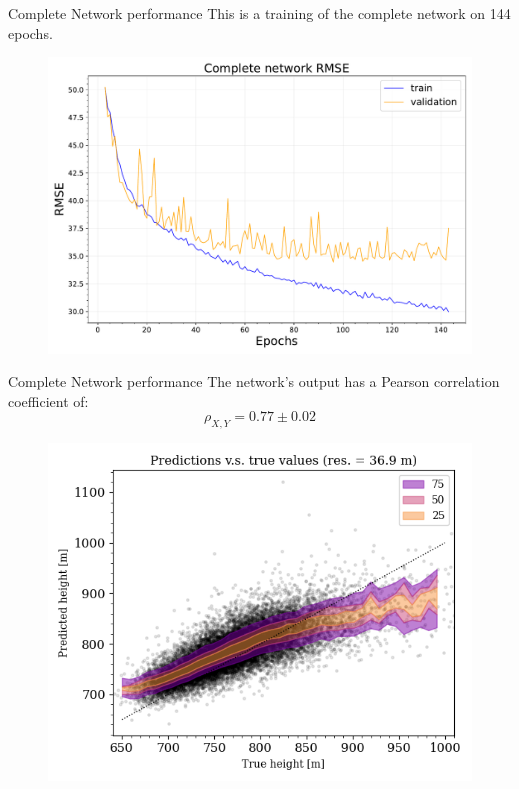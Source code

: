 \documentclass{beamer}
\begin{document}
\begin{frame}{Complete Network performance}
    This is a training of the complete network on 144 epochs.
    \begin{figure}
        \centering
        \includegraphics[width=.7\textwidth]{figures/long_run_rmse.pdf}
    \end{figure}
    
\end{frame}

\begin{frame}{Complete Network performance}
    The network's output has a Pearson correlation coefficient of:
    \begin{equation*}
        \rho_{X,Y} = 0.77 \pm 0.02
    \end{equation*}
    \begin{figure}
        \centering
        \includegraphics[width=.7\textwidth]{figures/long_run_vanilla.png}
    \end{figure}
    
\end{frame}
\end{document}
